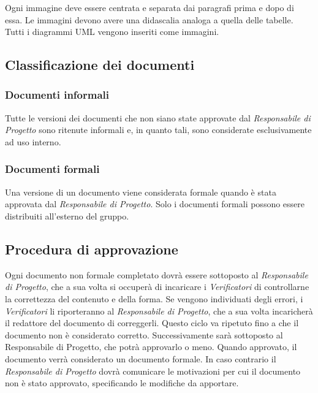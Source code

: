 \documentclass[../NormediProgetto.tex]{subfiles}
\begin{document}
Ogni immagine deve essere centrata e separata dai paragrafi prima e dopo di essa. Le immagini devono avere una didascalia analoga a quella delle tabelle. Tutti i diagrammi UML vengono inseriti come immagini.

\subsection{Classificazione dei documenti}

\subsubsection{Documenti informali}

Tutte le versioni dei documenti che non siano state approvate dal \textit{Responsabile di Progetto} sono ritenute informali e, in quanto tali, sono considerate esclusivamente ad uso interno.

\subsubsection{Documenti formali}

Una versione di un documento viene considerata formale quando è stata approvata dal \textit{Responsabile di Progetto}. Solo i documenti formali possono essere distribuiti all’esterno del gruppo. 

\subsection{Procedura di approvazione}

Ogni documento non formale completato dovrà essere sottoposto al \textit{Responsabile di Progetto}, che a sua volta si occuperà di incaricare i \textit{Verificatori} di controllarne la correttezza del contenuto e della forma. Se vengono individuati degli errori, i \textit{Verificatori} li riporteranno al \textit{Responsabile di Progetto}, che a sua volta incaricherà il redattore del documento di correggerli. Questo ciclo va ripetuto fino a che il documento non è considerato corretto. Successivamente sarà sottoposto al Responsabile di Progetto, che potrà approvarlo o meno. Quando approvato, il documento verrà considerato un documento formale. In caso contrario il \textit{Responsabile di Progetto} dovrà comunicare le motivazioni per cui il documento non è stato approvato, specificando le modifiche da apportare.
\end{document}
